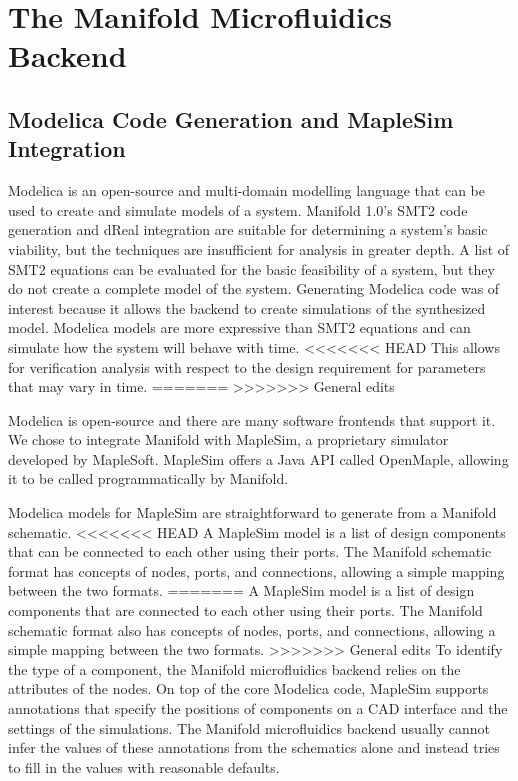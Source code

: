 \section{The Manifold Microfluidics Backend}

\subsection{Modelica Code Generation and MapleSim Integration}

Modelica is an open-source and multi-domain modelling language that can be used
to create and simulate models of a system. \cite{Maplesim}\cite{modelica}
Manifold 1.0's SMT2 code generation and dReal integration are suitable for
determining a system's basic viability, but the techniques are insufficient for
analysis in greater depth.
A list of SMT2 equations can be evaluated for the basic feasibility of a system, but they do not create
a complete model of the system.
Generating Modelica code was of interest because it allows the backend to create simulations of the
synthesized model.
Modelica models are more expressive than SMT2 equations and can simulate how the system will behave with time. 
<<<<<<< HEAD
This allows for verification analysis
with respect to the design requirement for parameters that may vary in time.
=======
>>>>>>> General edits

Modelica is open-source and there are many software frontends that support it.
We chose to integrate Manifold with MapleSim, a proprietary simulator developed by MapleSoft.
MapleSim offers a Java API called OpenMaple, allowing it to be called programmatically by Manifold.

Modelica models for MapleSim are straightforward to generate from a Manifold schematic.
<<<<<<< HEAD
A MapleSim model is a list of design components that can be connected to each other using their ports.
The Manifold schematic format has concepts of nodes, ports, and connections, allowing a simple mapping between the two formats.
=======
A MapleSim model is a list of design components that are connected to each other using their ports.
The Manifold schematic format also has concepts of nodes, ports, and connections, allowing a simple mapping
between the two formats.
>>>>>>> General edits
To identify the type of a component, the Manifold microfluidics backend relies on the attributes of the nodes.
On top of the core Modelica code, MapleSim supports annotations that specify the positions of components on a CAD interface and the settings of the simulations.
The Manifold microfluidics backend usually cannot infer the values of these annotations from the schematics
alone and instead tries to fill in the values with reasonable defaults.

